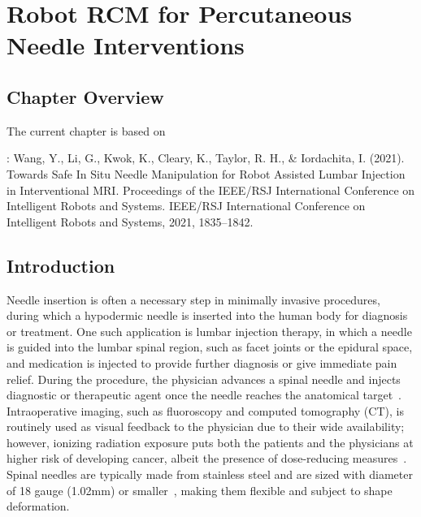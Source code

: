 \chapter{Robot RCM for Percutaneous Needle Interventions} \label{chap:chap-2}

\section{Chapter Overview}
\label{sec:chap-2-overview}

The current chapter is based on

\parencite{wangSafeSituNeedle2021}: Wang, Y., Li, G., Kwok, K., Cleary, K., Taylor, R. H., \& Iordachita, I. (2021). Towards Safe In Situ Needle Manipulation for Robot Assisted Lumbar Injection in Interventional MRI. Proceedings of the IEEE/RSJ International Conference on Intelligent Robots and Systems. IEEE/RSJ International Conference on Intelligent Robots and  Systems, 2021, 1835–1842.

\section{Introduction}
\label{sec:chap-2-introduction}

Needle insertion is often a necessary step in minimally invasive procedures, during which a hypodermic needle is inserted into the human body for diagnosis or treatment. One such application is lumbar injection therapy, in which a needle is guided into the lumbar spinal region, such as facet joints or the epidural space, and medication is injected to provide further diagnosis or give immediate pain relief. During the procedure, the physician advances a spinal needle and injects diagnostic or therapeutic agent once the needle reaches the anatomical target~\parencite{silbergleitImagingguidedInjectionTechniques2001}. Intraoperative imaging, such as fluoroscopy and computed tomography (CT), is routinely used as visual feedback to the physician due to their wide availability; however, ionizing radiation exposure puts both the patients and the physicians at higher risk of developing cancer, albeit the presence of dose-reducing measures~\parencite{giordanoCervicalSpineImaging2008,leeMeasurementsSurgeonsExposure2012}. Spinal needles are typically made from stainless steel and are sized with diameter of 18 gauge (1.02mm) or smaller~\parencite{silbergleitImagingguidedInjectionTechniques2001,calthorpeHistorySpinalNeedles2004,tsenNeedlesUsedSpinal2006}, making them flexible and subject to shape deformation.

